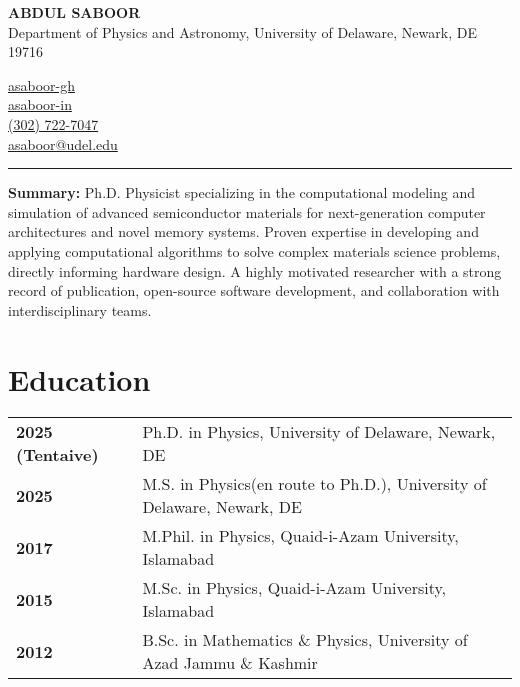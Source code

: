 \documentclass[letter,11pt]{article}
\begin{document}
\begin{minipage}{0.65\textwidth}
    \raggedright
    {\Large \textbf{ABDUL SABOOR}} \\ 
    Department of Physics and Astronomy, University of Delaware, Newark, DE 19716 
\end{minipage}
\hfill
\begin{minipage}{0.3\textwidth}
    \raggedright
    \faGithub \quad \href{https://github.com/asaboor-gh}{asaboor-gh}\\
    \faLinkedin \quad \href{https://linkedin.com/in/asaboor-in}{asaboor-in} \\
    \faPhone \quad \href{tel:+13027227047}{(302) 722-7047} \\
    \faEnvelope \quad \href{mailto:asaboor@udel.edu}{asaboor@udel.edu}
\end{minipage}
\vspace{2mm}
\hrule
\vspace{4mm} 

\noindent
\textbf{Summary:} Ph.D. Physicist specializing in the computational modeling and simulation of advanced semiconductor materials for next-generation computer architectures and novel memory systems. Proven expertise in developing and applying computational algorithms to solve complex materials science problems, directly informing hardware design. A highly motivated researcher with a strong record of publication, open-source software development, and collaboration with interdisciplinary teams.

\section{Education}
\begin{tabular}{p{3.25cm} p{12cm}}
    \textbf{2025 (Tentaive)} & Ph.D. in Physics, University of Delaware, Newark, DE \\
    \textbf{2025} & M.S. in Physics(en route to Ph.D.), University of Delaware, Newark, DE \\
    \textbf{2017} & M.Phil. in Physics, Quaid-i-Azam University, Islamabad \\
    \textbf{2015} & M.Sc. in Physics, Quaid-i-Azam University, Islamabad \\
    \textbf{2012} & B.Sc. in Mathematics \& Physics, University of Azad Jammu \& Kashmir \\
\end{tabular}
\end{document}
